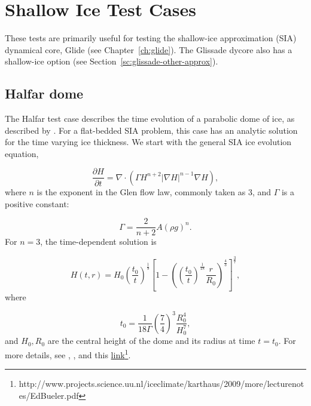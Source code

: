 
\section{Shallow Ice Test Cases}
\label{sc:sia-tests}

These tests are primarily useful for testing the shallow-ice approximation (SIA) dynamical core, Glide (see Chapter~\ref{ch:glide}).
The Glissade dycore also has a shallow-ice option (see Section~\ref{sc:glissade-other-approx}).

\subsection{Halfar dome}

\label{sec:halfar_description}
The Halfar test case describes the time evolution of a parabolic dome of ice, as described by \citet{Halfar1983}.
For a flat-bedded SIA problem, this case has an analytic solution for the time varying ice thickness. We start with the
general SIA ice evolution equation,  

\begin{equation}
    \label{halfar}
    \frac{\partial H}{\partial t} = \nabla \cdot (\Gamma H^{n+2} |\nabla H|^{n-1} \nabla H),
\end{equation}
%
where $n$ is the exponent in the Glen flow law, commonly taken as 3, and $\Gamma$ is a positive constant:

\begin{equation}
    \Gamma = \frac{2}{n+2} A (\rho g)^n.
\end{equation}
%
For $n=3$, the time-dependent solution is

\begin{equation}
    H(t,r) = H_0 \left(\frac{t_0}{t}\right)^\frac{1}{9}  \left[ 1 - \left(  \left( \frac{t_0}{t} \right) ^ \frac{1}{18} \frac{r}{R_0} \right)^\frac{4}{3} \right] ^ \frac{3}{7},
\end{equation}
%
where

\begin{equation}
    t_0 = \frac{1}{18\Gamma} \left( \frac{7}{4} \right)^3 \frac{R_0^4}{H_0^7},
\end{equation}
%
and $H_0, R_0$ are the central height of the dome and its radius at time $t=t_0$.
For more details, see \citet{Halfar1983}, \citet{Bueler2005}, and this \href{http://www.projects.science.uu.nl/iceclimate/karthaus/2009/more/lecturenotes/EdBueler.pdf}{link}\footnote{http://www.projects.science.uu.nl/iceclimate/karthaus/2009/more/lecturenotes/EdBueler.pdf}.

